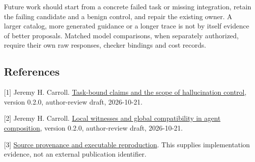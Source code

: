 \documentclass[
  11pt,
]{article}
\begin{document}
Future work should start from a concrete failed task or missing
integration, retain the failing candidate and a benign control, and
repair the existing owner. A larger catalog, more generated guidance or
a longer trace is not by itself evidence of better proposals. Matched
model comparisons, when separately authorized, require their own raw
responses, checker bindings and cost records.

\subsection{References}\label{references}

{[}1{]} Jeremy H. Carroll.
\href{https://github.com/dbccpage/the_symbol_game/blob/main/atlas/coda_atlas/F004_papers/015_pfp/023_pfp_task_bound_claims_and_hallucination_control/paper.md}{Task-bound
claims and the scope of hallucination control}, version 0.2.0,
author-review draft, 2026-10-21.

{[}2{]} Jeremy H. Carroll.
\href{https://github.com/dbccpage/the_symbol_game/blob/main/atlas/coda_atlas/F004_papers/015_pfp/025_pfp_local_to_global_agent_composition/paper.md}{Local
witnesses and global compatibility in agent composition}, version 0.2.0,
author-review draft, 2026-10-21.

{[}3{]}
\href{https://github.com/dbccpage/the_symbol_game/blob/main/atlas/coda_atlas/F004_papers/015_pfp/028_pfp_operadic_composition_and_bounded_ddc_repair/docs/reproduction.md}{Source
provenance and executable reproduction}. This supplies implementation
evidence, not an external publication identifier.
\end{document}
